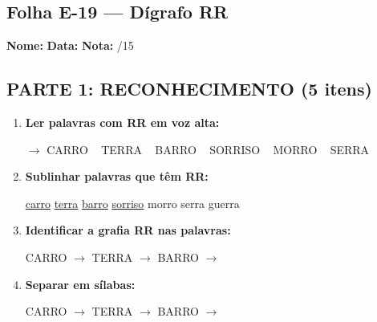 \subsection{Folha E-19 --- Dígrafo RR}
\begin{exercicio}



\noindent\textbf{Nome:} \underline{\hspace{3.2cm}} \quad \textbf{Data:} \underline{\hspace{1.6cm}} \quad \textbf{Nota:} \underline{\hspace{0.9cm}}/15


\subsection*{PARTE 1: RECONHECIMENTO (5 itens)}

\begin{enumerate}

  \item \textbf{Ler palavras com RR em voz alta:}
  \begin{center}
  $\rightarrow$ CARRO ~ TERRA ~ BARRO ~ SORRISO ~ MORRO ~ SERRA
  \end{center}

  \item \textbf{Sublinhar palavras que têm RR:}

\begin{center}
  \uline{carro} \quad \uline{terra} \quad \uline{barro} \quad \uline{sorriso} \quad morro \quad serra \quad guerra
\end{center}

  \item \textbf{Identificar a grafia RR nas palavras:}
  \begin{center}
  CARRO $\rightarrow$ \underline{\hspace{1cm}} \quad TERRA $\rightarrow$ \underline{\hspace{1cm}} \quad BARRO $\rightarrow$ \underline{\hspace{1cm}}
  \end{center}

  \item \textbf{Separar em sílabas:}
  \begin{center}
  CARRO $\rightarrow$ \underline{\hspace{1.2cm}} \quad TERRA $\rightarrow$ \underline{\hspace{1.2cm}} \quad BARRO $\rightarrow$ \underline{\hspace{1.2cm}}
  \end{center}


\end{enumerate}
\end{exercicio}
